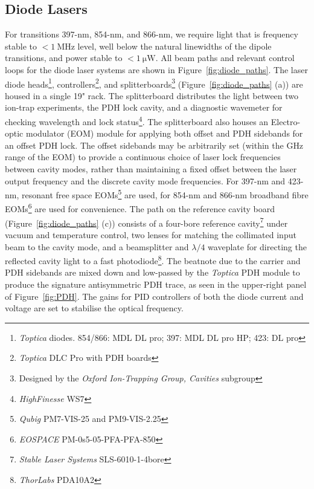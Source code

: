\subsection{Diode Lasers}
\label{sec:Diode Lasers}
    For transitions 397-nm, 854-nm, and 866-nm, we require light that is frequency stable
    to $<1~\unit{\mega\hertz}$ level, well below the natural linewidths of the
    dipole transitions, and power stable to $<1~\unit{\micro\watt}$. 
    All beam paths and relevant control loops for the diode laser systems are
    shown in Figure~\ref{fig:diode_paths}. The laser diode
    heads\footnote{\emph{Toptica} diodes. 854/866: MDL DL pro; 397: MDL DL pro
    HP; 423: DL pro}, controllers\footnote{\emph{Toptica} DLC Pro with PDH
    boards}, and splitterboards\footnote{Designed by the \emph{Oxford Ion-Trapping Group, Cavities} subgroup}
    (Figure~\ref{fig:diode_paths} (a)) are housed in a single 19" rack. The
    splitterboard distributes the light between two ion-trap experiments, the
    PDH lock cavity, and a diagnostic wavemeter
    for checking wavelength and lock status\footnote{\emph{HighFinesse} WS7}.
    The splitterboard also houses an Electro-optic modulator (EOM) module for
    applying both offset and PDH sidebands for an offset PDH lock. The offset sidebands may be arbitrarily set (within the $\unit{\giga\hertz}$ range of the EOM) to provide a continuous choice of laser lock frequencies between cavity modes, rather than maintaining a fixed offset between the laser output frequency and the discrete cavity mode frequencies. For 397-nm
    and 423-nm, resonant free space EOMs\footnote{\emph{Qubig} PM7-VIS-25 and PM9-VIS-2.25}
    are used, for 854-nm and 866-nm broadband fibre EOMs\footnote{\emph{EOSPACE} PM-0s5-05-PFA-PFA-850} are used
    for convenience. The path on the reference cavity board
    (Figure~\ref{fig:diode_paths} (c)) consists of a four-bore reference
    cavity\footnote{\emph{Stable Laser Systems} SLS-6010-1-4bore} under vacuum and
    temperature control, two lenses for matching the collimated input beam to the
    cavity mode, and a beamsplitter and $\lambda/4$ waveplate for directing the
    reflected cavity light to a fast photodiode\footnote{\emph{ThorLabs} PDA10A2}.
    The beatnote due to the carrier and PDH sidebands are mixed down and
    low-passed by the \emph{Toptica} PDH module to produce the signature
    antisymmetric PDH trace, as seen in the upper-right panel of Figure~\ref{fig:PDH}. The gains for PID controllers of both the diode current
    and voltage are set to stabilise the optical frequency.

